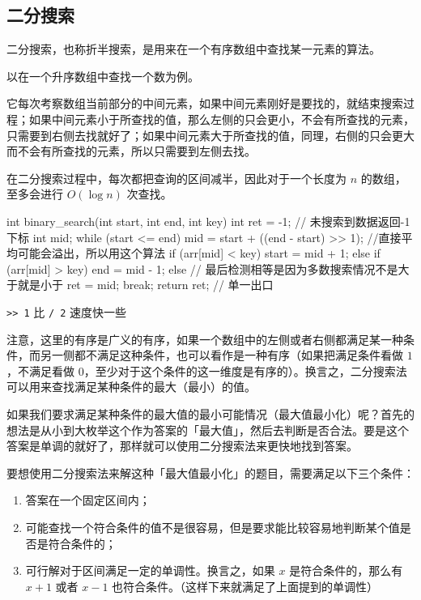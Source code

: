 
\subsection{二分搜索}

二分搜索，也称折半搜索，是用来在一个有序数组中查找某一元素的算法。

以在一个升序数组中查找一个数为例。

它每次考察数组当前部分的中间元素，如果中间元素刚好是要找的，就结束搜索过程；如果中间元素小于所查找的值，那么左侧的只会更小，不会有所查找的元素，只需要到右侧去找就好了；如果中间元素大于所查找的值，同理，右侧的只会更大而不会有所查找的元素，所以只需要到左侧去找。

在二分搜索过程中，每次都把查询的区间减半，因此对于一个长度为 $n$ 的数组，至多会进行 $O(\log n)$ 次查找。

\begin{cppcode}
int binary_search(int start, int end, int key) {
  int ret = -1;  // 未搜索到数据返回-1下标
  int mid;
  while (start <= end) {
    mid = start + ((end - start) >> 1);  //直接平均可能会溢出，所以用这个算法
    if (arr[mid] < key)
      start = mid + 1;
    else if (arr[mid] > key)
      end = mid - 1;
    else {  // 最后检测相等是因为多数搜索情况不是大于就是小于
      ret = mid;
      break;
    }
  }
  return ret;  // 单一出口
}
\end{cppcode}

\begin{NOTE}{}{}
\texttt{>> 1} 比 \texttt{/ 2} 速度快一些
\end{NOTE}


注意，这里的有序是广义的有序，如果一个数组中的左侧或者右侧都满足某一种条件，而另一侧都不满足这种条件，也可以看作是一种有序（如果把满足条件看做 $1$，不满足看做 $0$，至少对于这个条件的这一维度是有序的）。换言之，二分搜索法可以用来查找满足某种条件的最大（最小）的值。

如果我们要求满足某种条件的最大值的最小可能情况（最大值最小化）呢？首先的想法是从小到大枚举这个作为答案的「最大值」，然后去判断是否合法。要是这个答案是单调的就好了，那样就可以使用二分搜索法来更快地找到答案。

要想使用二分搜索法来解这种「最大值最小化」的题目，需要满足以下三个条件：

\begin{enumerate}
\item 答案在一个固定区间内；
\item 可能查找一个符合条件的值不是很容易，但是要求能比较容易地判断某个值是否是符合条件的；
\item 可行解对于区间满足一定的单调性。换言之，如果 $x$ 是符合条件的，那么有 $x + 1$ 或者 $x - 1$ 也符合条件。（这样下来就满足了上面提到的单调性）
\end{enumerate}

